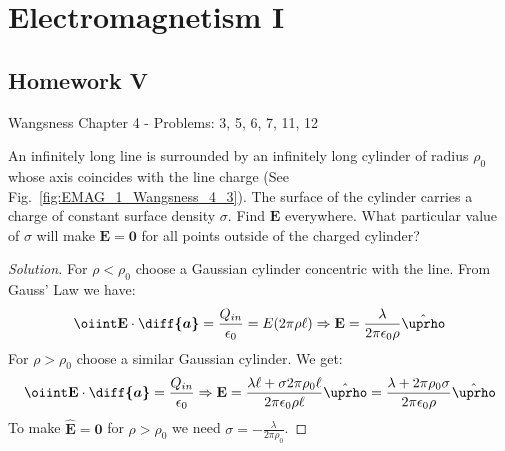 \documentclass[crop=false,class=article,oneside]{standalone}
\begin{document}
    \ifx\ifphysicscourseselectromagnetismI\undefined
        \section*{Electromagnetism I}
        \setcounter{section}{5}
        \renewcommand\thesubfigure{%
            \arabic{section}.\arabic{figure}.\arabic{subfigure}%
        }
    \fi
    \subsection{Homework V}
    Wangsness Chapter 4 - Problems: 3, 5, 6, 7, 11, 12
    \begin{problem}[Wangsness 4-3]
        \label{problem:EMAG_wangsness_4_3}
        An infinitely long line is surrounded by an infinitely
        long cylinder of radius $\rho_{0}$ whose axis coincides
        with the line charge
        (See Fig.~\ref{fig:EMAG_1_Wangsness_4_3}). The surface
        of the  cylinder carries a charge of constant surface
        density $\sigma$. Find $\mathbf{E}$ everywhere. What
        particular value of $\sigma$ will make
        $\mathbf{E}=\mathbf{0}$
        for all points outside of the charged cylinder?
    \end{problem}
    \begin{proof}[Solution]
        For $\rho<\rho_0$ choose a Gaussian cylinder concentric
        with the line. From Gauss' Law we have:
        \begin{equation*}
            \oiint\mathbf{E}\cdot\boldsymbol{\diff{a}}
            =\frac{Q_{in}}{\epsilon_0}
            =E(2\pi\rho\ell)\Rightarrow
            \mathbf{E}
            =\frac{\lambda}{2\pi\epsilon_{0}\rho}
            \hat{\boldsymbol{\uprho}}
        \end{equation*}
        For $\rho>\rho_{0}$ choose a similar
        Gaussian cylinder. We get:
        \begin{equation*}
            \oiint\mathbf{E}\cdot\boldsymbol{\diff{a}}
            =\frac{Q_{in}}{\epsilon_{0}}
            \Rightarrow\mathbf{E}
            =\frac{\lambda\ell+\sigma 2\pi\rho_{0}\ell}
            {2\pi\epsilon_{0}\rho\ell}\hat{\boldsymbol{\uprho}}
            =\frac{\lambda+2\pi\rho_{0}\sigma}{2\pi\epsilon_{0}\rho}
            \hat{\boldsymbol{\uprho}}
        \end{equation*}
        To make $\hat{\mathbf{E}}=\mathbf{0}$
        for $\rho>\rho_{0}$ we need
        $\sigma=-\frac{\lambda}{2\pi\rho_{0}}$.
    \end{proof}
\end{document}
